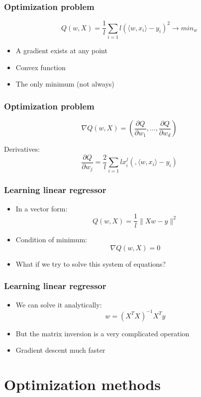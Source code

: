 \documentclass[default]{beamer}
\begin{document}
	\begin{frame}
		\frametitle{Optimization problem}
		
		\[
			Q(w,X)=\frac{1}{l}\sum_{i=1}{l}(\langle w,x_i \rangle-y_i)^2\rightarrow min_w
		\]
		
		\begin{itemize}
			\item A gradient exists at any point
			\item Convex function
			\item The only minimum (not always)
		\end{itemize}
	\end{frame}

	\begin{frame}
		\frametitle{Optimization problem}
		
		\[
		\nabla Q(w, X)=\left(\frac{\partial Q}{\partial w_1},\dots,\frac{\partial Q}{\partial w_d} \right)
		\]
		
		Derivatives:
		\[
			\frac{\partial Q}{\partial w_j}=\frac{2}{l}\sum_{i=1}{l}x_i^j(,\langle w,x_i\rangle-y_i)
		\]
	\end{frame}
	
	
	\begin{frame}
		\frametitle{Learning linear regressor}

		\begin{itemize}
			\item In a vector form:
			\[
				Q(w,X)=\frac{1}{l}\|Xw-y\|^2
			\]
			
			\item Condition of minimum:
			\[
				\nabla Q(w,X)=0
			\]
			\item What if we try to solve this system of equations?
		\end{itemize}
	\end{frame}

	\begin{frame}
		\frametitle{Learning linear regressor}
		
		\begin{itemize}
			\item We can solve it analytically:
			\[
				w=(X^TX)^{-1}X^Ty
			\]
			
			\item But the matrix inversion is a very complicated operation
			\item Gradient descent much faster
		\end{itemize}
	\end{frame}
	
	\section{Optimization methods}
\end{document}
